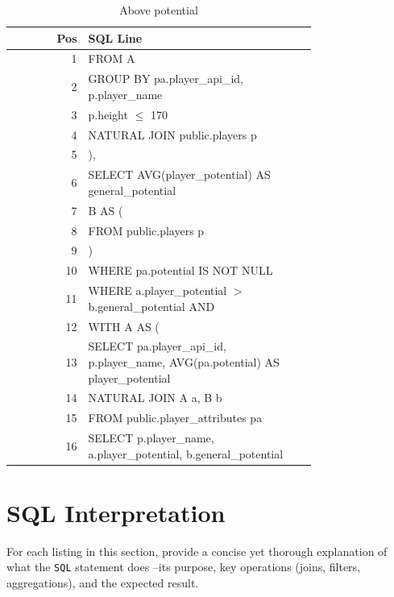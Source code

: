 \documentclass{article}
\begin{document}
\begin{table}[t]
  \centering
  \caption{Above potential}
  \label{tab:potential}
  \begin{tabular}{r p{0.75\linewidth}}
    \toprule
    \textbf{Pos}
    & \textbf{SQL Line} \\
    \midrule
    1
    &   FROM A \\
    2
    &   GROUP BY pa.player\_api\_id, p.player\_name \\
    3
    & 	p.height $\leq$ 170 \\
    4
    &   NATURAL JOIN public.players p \\
    5
    & ), \\
    6
    &   SELECT AVG(player\_potential) AS general\_potential \\
    7
    & B AS ( \\
    8
    & FROM public.players p \\
    9
    & ) \\
    10
    &   WHERE pa.potential IS NOT NULL \\
    11
    & WHERE a.player\_potential $>$ b.general\_potential AND \\
    12
    & WITH A AS ( \\
    13
    &   SELECT pa.player\_api\_id, p.player\_name, AVG(pa.potential) AS player\_potential \\
    14
    & NATURAL JOIN A a, B b \\
    15
    &   FROM public.player\_attributes pa \\
    16
    & SELECT p.player\_name, a.player\_potential, b.general\_potential \\
    \bottomrule
  \end{tabular}
\end{table}

\pagebreak

\section{SQL Interpretation}

For each listing in this section, provide a concise yet thorough explanation of what the \texttt{SQL} statement does --its purpose, key operations (joins, filters, aggregations), and the expected result.
\end{document}
